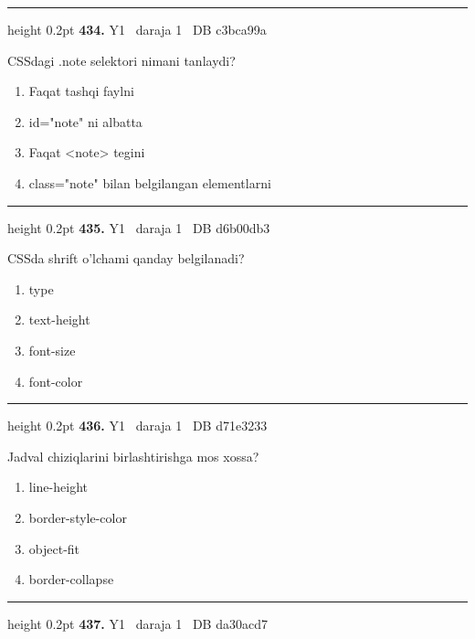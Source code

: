 \documentclass[10pt,a4paper,oneside]{article}
\begin{document}
\vspace{2mm}\hrule height 0.2pt \vspace{4mm}
\hypertarget{q434}{\textbf{\color{ink}434.}}  {\color{muted}\scriptsize Y1 \textbullet\ daraja 1 \textbullet\ DB c3bca99a}
\par
CSSdagi .note selektori nimani tanlaydi?
\begin{enumerate}[label=\Alph*),leftmargin=9mm]
\item Faqat tashqi faylni
\item id="note" ni albatta
\item Faqat \textless{}note\textgreater{} tegini
\item class="note" bilan belgilangan elementlarni
\end{enumerate}
\vspace{2mm}\hrule height 0.2pt \vspace{4mm}
\hypertarget{q435}{\textbf{\color{ink}435.}}  {\color{muted}\scriptsize Y1 \textbullet\ daraja 1 \textbullet\ DB d6b00db3}
\par
CSSda shrift o'lchami qanday belgilanadi?
\begin{enumerate}[label=\Alph*),leftmargin=9mm]
\item type
\item text-height
\item font-size
\item font-color
\end{enumerate}
\vspace{2mm}\hrule height 0.2pt \vspace{4mm}
\hypertarget{q436}{\textbf{\color{ink}436.}}  {\color{muted}\scriptsize Y1 \textbullet\ daraja 1 \textbullet\ DB d71e3233}
\par
Jadval chiziqlarini birlashtirishga mos xossa?
\begin{enumerate}[label=\Alph*),leftmargin=9mm]
\item line-height
\item border-style-color
\item object-fit
\item border-collapse
\end{enumerate}
\vspace{2mm}\hrule height 0.2pt \vspace{4mm}
\hypertarget{q437}{\textbf{\color{ink}437.}}  {\color{muted}\scriptsize Y1 \textbullet\ daraja 1 \textbullet\ DB da30acd7}
\par
\end{document}
